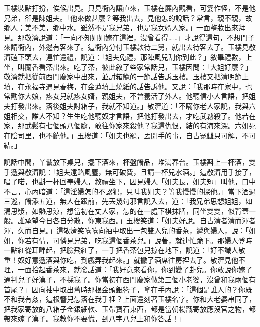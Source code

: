 玉樓裝點打扮，俟候出見。只見衙內讓直來，玉樓在簾內觀看，可霎作怪，不是他兄弟，卻是陳姐夫。「他來做甚麼？等我出去，見他怎的說話？常言，親不親，故鄉人；美不美，鄉中水。雖然不是我兄弟，也是我女婿人家。」一面整妝出來拜見。那敬濟說道：「一向不知姐姐嫁在這裡，沒曾看得……」才說得這句，不想門子來請衙內，外邊有客來了。這衙內分付玉樓款待二舅，就出去待客去了。玉樓見敬濟磕下頭去，連忙還禮，說道：「姐夫免禮，那陣風兒刮你到此？」敘畢禮數，上坐，叫蘭香看茶出來。吃了茶，彼此敘了些家常話兒，玉樓因問：「大姐好麼？」敬濟就把從前西門慶家中出來，並討箱籠的一節話告訴玉樓。玉樓又把清明節上墳，在永福寺遇見春梅，在金蓮墳上燒紙的話告訴他。又說：「我那時在家中，也常勸你大娘，疼女兒就疼女婿，親姐夫，不曾養活了外人。他聽信小人言語，把姐夫打發出來。落後姐夫討箱子，我就不知道。」敬濟道：「不瞞你老人家說，我與六姐相交，誰人不知？生生吃他聽奴才言語，把他打發出去，才吃武鬆殺了。他若在家，那武鬆有七個頭八個膽，敢往你家來殺他？我這仇恨，結的有海來深。六姐死在陰司里，也不饒他。」玉樓道：「姐夫也罷，丟開手的事，自古冤讎只可解，不可結。」

說話中間，丫鬟放下桌兒，擺下酒來，杯盤餚品，堆滿春台。玉樓斟上一杯酒，雙手遞與敬濟說：「姐夫遠路風塵，無可破費，且請一杯兒水酒。」這敬濟用手接了，唱了喏，也斟一杯回奉婦人，敘禮坐下，因見婦人「姐夫長，姐夫短」叫他，口中不言，心內暗道：「這淫婦怎的不認犯，只叫我姐夫？等我慢慢的探他。」當下酒過三巡，餚添五道，無人在跟前，先丟幾句邪言說入去，道：「我兄弟思想姐姐，如渴思漿，如熱思涼，想當初在丈人家，怎的在一處下棋抹牌，同坐雙雙，似背蓋一般。誰承望今日各自分散，你東我西。」玉樓笑道：「姐夫好說。自古清者清而渾者渾，久而自見。」這敬濟笑嘻嘻向袖中取出一包雙人兒的香茶，遞與婦人，說：「姐姐，你若有情，可憐見兄弟，吃我這個香茶兒。」說著，就連忙跪下。那婦人登時一點紅從耳畔起，把臉飛紅了，一手把香茶包兒掠在地下，說道：「好不識人敬重！奴好意遞酒與你吃，到戲弄我起來。」就撇了酒席往房裡去了。敬濟見他不理，一面拾起香茶來，就發話道：「我好意來看你，你到變了卦兒。你敢說你嫁了通判兒子好漢子，不採我了。你當初在西門慶家做第三個小老婆，沒曾和我兩個有首尾？」因向袖中取出舊時那根金頭銀簪子，拿在手內說：「這個是誰人的？你既不和我有姦，這根簪兒怎落在我手裡？上面還刻著玉樓名字。你和大老婆串同了，把我家寄放的八箱子金銀細軟、玉帶寶石東西，都是當朝楊戩寄放應沒官之物，都帶來嫁了漢子。我教你不要慌，到八字八兒上和你答話！」

